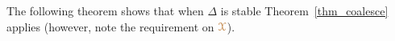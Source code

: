 


The following theorem shows that when $\Delta$ is stable Theorem~\ref{thm_coalesce} applies (however, note the requirement on ${\color{brown}\EuScript X}$).


